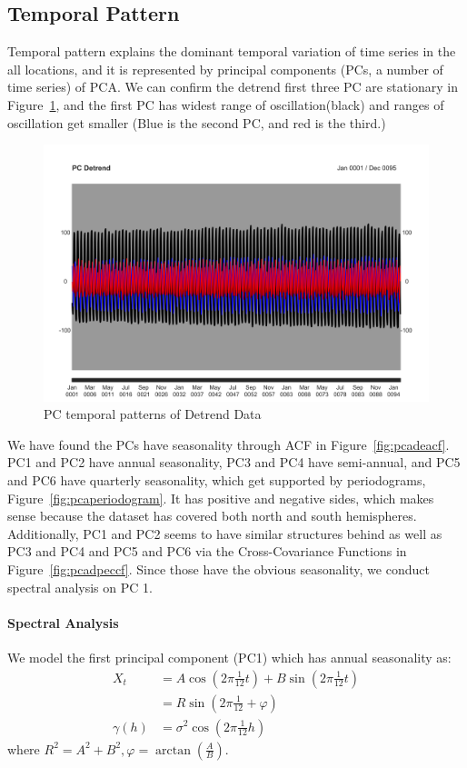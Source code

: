 \documentclass[11pt]{article}
\begin{document}
\subsection{Temporal Pattern}
Temporal pattern explains the dominant temporal variation of time series in the all locations, and it is represented by principal components (PCs, a number of time series) of PCA.  We can confirm the detrend first three PC are stationary in Figure~\ref{fig:pc-tsde}, and the first PC has widest range of oscillation(black) and ranges of oscillation get smaller (Blue is the second PC, and red is the third.)
\begin{figure}
	\centering
	\includegraphics[width=0.7\linewidth]{../img/PC-ts_de}
	\caption{PC temporal patterns of Detrend Data}
	\label{fig:pc-tsde}
\end{figure}

We have found the PCs have seasonality through ACF in Figure~\ref{fig:pcadeacf}. PC1 and PC2 have annual seasonality, PC3 and PC4 have semi-annual, and PC5 and PC6 have quarterly seasonality, which get supported by periodograms, Figure~\ref{fig:pcaperiodogram}. It has positive and negative sides, which makes sense because the dataset has covered both north and south hemispheres. Additionally, PC1 and PC2 seems to have similar structures behind as well as PC3 and PC4 and PC5 and PC6 via the Cross-Covariance Functions in Figure~\ref{fig:pcadpeccf}. Since those have the obvious seasonality, we conduct spectral analysis on PC 1.


\paragraph{Spectral Analysis}
We model the first principal component (PC1) which has annual seasonality as:
\begin{align}
X_t &= A\cos(2\pi\frac{1}{12}t) + B\sin(2\pi\frac{1}{12}t)  \\ 
&= R\sin(2\pi\frac{1}{12} + \varphi)\\
\gamma(h) &= \sigma^2\cos(2\pi\frac{1}{12}h) 
\end{align}
where $R^2 = A^2 + B^2, \varphi = \arctan(\frac{A}{B})$.
\end{document}
